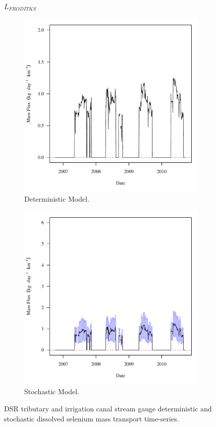 \subfiguremid
\begin{landscape}
	\begin{figure}
		$ \displaystyle L_{FRODITKS} $
		\begin{subfigure}{0.7\textwidth}
			\centering
			\includegraphics[width=\tableCustomSize]{"Figures/Results_DSR/Deterministic/f FRO"}
			\caption{Deterministic Model.}
		\end{subfigure}%
		\begin{subfigure}{0.7\textwidth}
			\centering
			\includegraphics[width=\tableCustomSize]{"Figures/Results_DSR/Stochastic/f FRO"}
			\caption{Stochastic Model.}
		\end{subfigure}
		\caption{DSR tributary and irrigation canal stream gauge deterministic and stochastic dissolved selenium mass transport time-series.}
	\end{figure}
\end{landscape}
